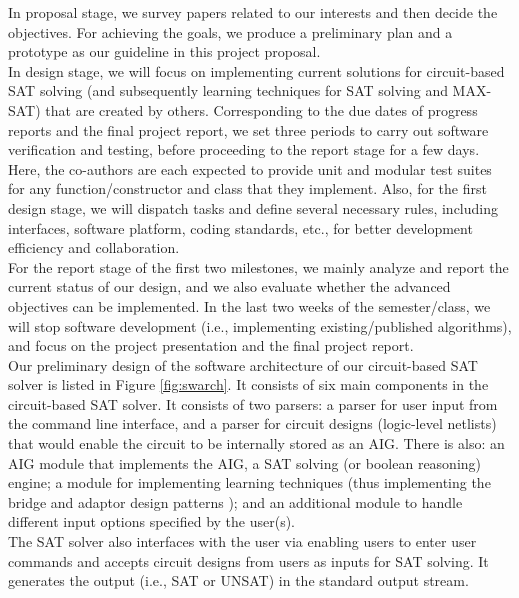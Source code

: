\documentclass[letter,12pt]{article}
\begin{document}
In proposal stage, we survey papers related to our interests and then decide the objectives. For achieving the goals, we produce a preliminary plan and a prototype as our guideline in this project proposal. \\

In design stage, we will focus on implementing current solutions for circuit-based SAT solving (and subsequently learning techniques for SAT solving and MAX-SAT) that are created by others. Corresponding to the due dates of progress reports and the final project report, we set three periods to carry out software verification and testing, before proceeding to the report stage for a few days. Here, the co-authors are each expected to provide unit and modular test suites for any function/constructor and class that they implement. Also, for the first design stage, we will dispatch tasks and define several necessary rules, including interfaces, software platform, coding standards, etc., for better development efficiency and collaboration. \\

For the report stage of the first two milestones, we mainly analyze and report the current status of our design, and we also evaluate whether the advanced objectives can be implemented. In the last two weeks of the semester/class, we will stop software development (i.e., implementing existing/published algorithms), and focus on the project presentation and the final project report. \\

Our preliminary design of the software architecture of our circuit-based SAT solver is listed in Figure \ref{fig:swarch}. It consists of six main components in the circuit-based SAT solver. It consists of two parsers: a parser for user input from the command line interface, and a parser for circuit designs (logic-level netlists) that would enable the circuit to be internally stored as an AIG. There is also: an AIG module that implements the AIG, a SAT solving (or boolean reasoning) engine; a module for implementing learning techniques (thus implementing the bridge and adaptor design patterns \cite{Gamma1995}); and an additional module to handle different input options specified by the user(s). \\

The SAT solver also interfaces with the user via enabling users to enter user commands and accepts circuit designs from users as inputs for SAT solving. It generates the output (i.e., SAT or UNSAT) in the standard output stream.
\end{document}
